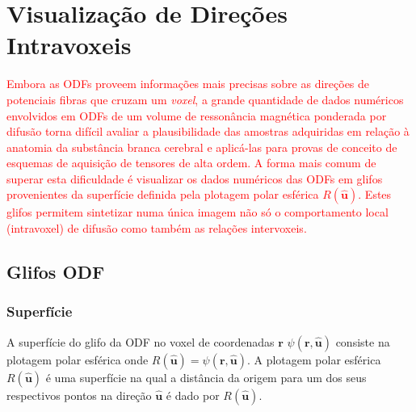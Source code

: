 \documentclass[
    12pt,                %
    oneside,            %
    a4paper,            %
    english,            %
    french,                %
    spanish,            %
    brazil                %
    ]{abntex2}
\begin{document}
\section{Visualização de Direções Intravoxeis}


\textcolor{red}{Embora as ODFs proveem informações mais precisas sobre as direções de potenciais fibras que cruzam um \textit{voxel}, a grande quantidade de dados numéricos envolvidos em ODFs de um volume de ressonância magnética ponderada por difusão torna difícil avaliar a plausibilidade das amostras adquiridas em relação à anatomia da substância branca cerebral e aplicá-las para provas de conceito de esquemas de aquisição de tensores de alta ordem. A forma mais comum de superar esta dificuldade é visualizar os dados numéricos das ODFs em glifos provenientes da superfície definida pela plotagem polar esférica $R(\mathbf{\hat{u}})$. Estes glifos permitem sintetizar numa única imagem não só o comportamento local (intravoxel) de difusão como também as relações intervoxeis.} 

\subsection{Glifos ODF}
\label{sec::glifos_odf}

\subsubsection{Superfície}

A superfície do glifo da ODF no voxel de coordenadas $\mathbf{r}$ $\psi(\mathbf{r}, \mathbf{\hat{u}})$ consiste na plotagem polar esférica onde $R(\mathbf{\hat{u}}) = \psi(\mathbf{r}, \mathbf{\hat{u}})$. A plotagem polar esférica $R(\mathbf{\hat{u}})$ é uma superfície na qual a distância da origem para um dos seus respectivos pontos na direção $\mathbf{\hat{u}}$ é dado por $R(\mathbf{\hat{u}})$.


\end{document}

